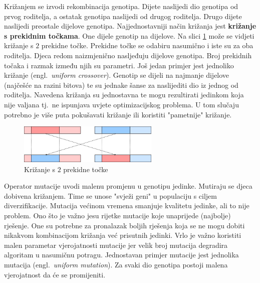 \documentclass[times, utf8, diplomski]{fer}
\begin{document}
Križanjem se izvodi rekombinacija genotipa. Dijete naslijedi dio genotipa od prvog roditelja, a ostatak genotipa naslijedi od drugog roditelja. Drugo dijete naslijedi preostale dijelove genotipa. Najjednostavniji način križanja jest \textbf{križanje s prekidnim točkama}. One dijele genotip na dijelove. Na slici \ref{fig:crossover} može se vidjeti križanje s $2$ prekidne točke. Prekidne točke se odabiru nasumično i iste su za oba roditelja. Djeca redom naizmjenično nasljeđuju dijelove genotipa. Broj prekidnih točaka i razmak između njih su parametri. Još jedan primjer jest jednoliko križanje (engl.~\textit{uniform crossover}). Genotip se dijeli na najmanje dijelove (najčešće na razini bitova) te su jednake šanse za naslijediti dio iz jednog od roditelja. Navedena križanja su jednostavna te mogu rezultirati jedinkom koja nije valjana tj.~ne ispunjava uvjete optimizacijskog problema. U tom slučaju potrebno je više puta pokušavati križanje ili koristiti "pametnije" križanje.

\begin{figure}[htb]
	\centering
	\includegraphics[width=0.6\textwidth]{img/crossover.png}
	\caption{Križanje s $2$ prekidne točke}
	\label{fig:crossover}
\end{figure}

Operator mutacije uvodi malenu promjenu u genotipu jedinke. Mutiraju se djeca dobivena križanjem. Time se unose "svježi geni" u populaciju s ciljem diverzifikacije. Mutacija većinom vremena smanjuje kvalitetu jedinke, ali to nije problem. Ono što je važno jesu rijetke mutacije koje unaprijede (najbolje) rješenje. One su potrebne za pronalazak boljih rješenja koja se ne mogu dobiti nikakvom kombinacijom križanja već prisutnih jedinki. Vrlo je važno koristiti malen parametar vjerojatnosti mutacije jer velik broj mutacija degradira algoritam u nasumičnu potragu. Jednostavan primjer mutacije jest jednolika mutacija (engl.~\textit{uniform mutation}). Za svaki dio genotipa postoji malena vjerojatnost da će se promijeniti.
\end{document}
